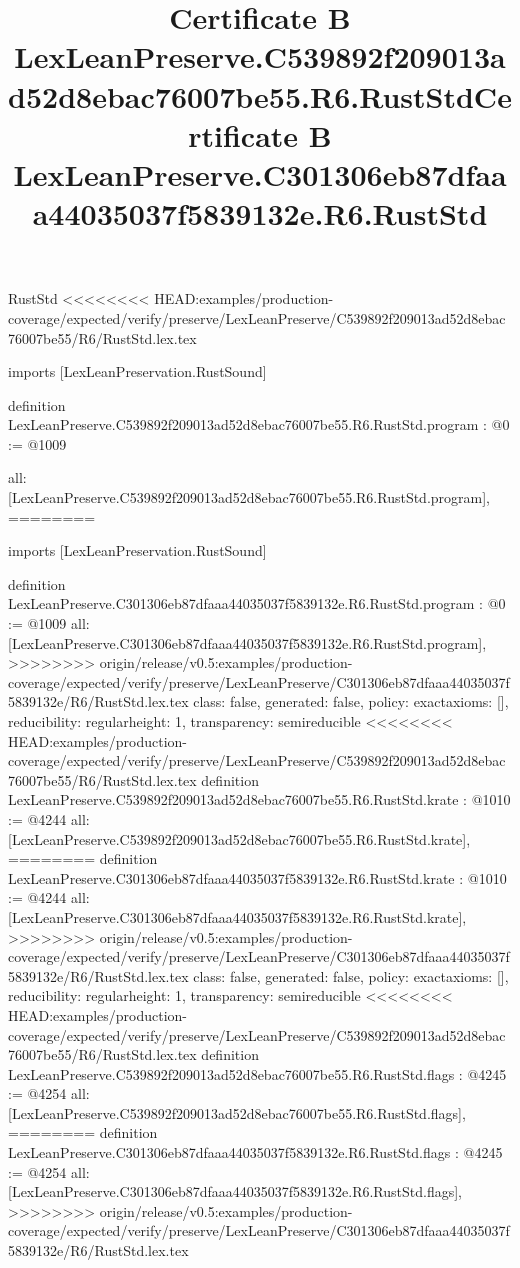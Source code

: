 \begin{lexlean}{RustStd}
<<<<<<<< HEAD:examples/production-coverage/expected/verify/preserve/LexLeanPreserve/C539892f209013ad52d8ebac76007be55/R6/RustStd.lex.tex
\title{Certificate B LexLeanPreserve.C539892f209013ad52d8ebac76007be55.R6.RustStd}
\begin{coremodule}
imports [LexLeanPreservation.RustSound]

definition LexLeanPreserve.C539892f209013ad52d8ebac76007be55.R6.RustStd.program : @0 := @1009 {
  all: [LexLeanPreserve.C539892f209013ad52d8ebac76007be55.R6.RustStd.program],
========
\title{Certificate B LexLeanPreserve.C301306eb87dfaaa44035037f5839132e.R6.RustStd}
\begin{coremodule}
imports [LexLeanPreservation.RustSound]

definition LexLeanPreserve.C301306eb87dfaaa44035037f5839132e.R6.RustStd.program : @0 := @1009 {
  all: [LexLeanPreserve.C301306eb87dfaaa44035037f5839132e.R6.RustStd.program],
>>>>>>>> origin/release/v0.5:examples/production-coverage/expected/verify/preserve/LexLeanPreserve/C301306eb87dfaaa44035037f5839132e/R6/RustStd.lex.tex
  class: false,
  generated: false,
  policy: exact{axioms: []},
  reducibility: regular{height: 1},
  transparency: semireducible
}
<<<<<<<< HEAD:examples/production-coverage/expected/verify/preserve/LexLeanPreserve/C539892f209013ad52d8ebac76007be55/R6/RustStd.lex.tex
definition LexLeanPreserve.C539892f209013ad52d8ebac76007be55.R6.RustStd.krate : @1010 := @4244 {
  all: [LexLeanPreserve.C539892f209013ad52d8ebac76007be55.R6.RustStd.krate],
========
definition LexLeanPreserve.C301306eb87dfaaa44035037f5839132e.R6.RustStd.krate : @1010 := @4244 {
  all: [LexLeanPreserve.C301306eb87dfaaa44035037f5839132e.R6.RustStd.krate],
>>>>>>>> origin/release/v0.5:examples/production-coverage/expected/verify/preserve/LexLeanPreserve/C301306eb87dfaaa44035037f5839132e/R6/RustStd.lex.tex
  class: false,
  generated: false,
  policy: exact{axioms: []},
  reducibility: regular{height: 1},
  transparency: semireducible
}
<<<<<<<< HEAD:examples/production-coverage/expected/verify/preserve/LexLeanPreserve/C539892f209013ad52d8ebac76007be55/R6/RustStd.lex.tex
definition LexLeanPreserve.C539892f209013ad52d8ebac76007be55.R6.RustStd.flags : @4245 := @4254 {
  all: [LexLeanPreserve.C539892f209013ad52d8ebac76007be55.R6.RustStd.flags],
========
definition LexLeanPreserve.C301306eb87dfaaa44035037f5839132e.R6.RustStd.flags : @4245 := @4254 {
  all: [LexLeanPreserve.C301306eb87dfaaa44035037f5839132e.R6.RustStd.flags],
>>>>>>>> origin/release/v0.5:examples/production-coverage/expected/verify/preserve/LexLeanPreserve/C301306eb87dfaaa44035037f5839132e/R6/RustStd.lex.tex
}}}
\end{coremodule}}
\end{coremodule}
\end{lexlean}
